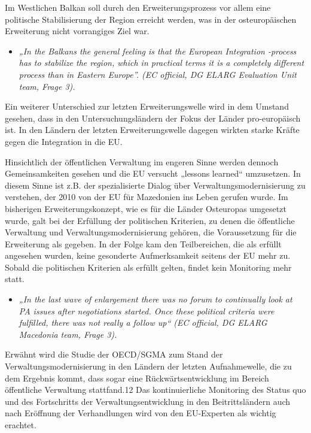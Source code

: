 Im Westlichen Balkan soll durch den Erweiterungsprozess vor allem eine politische Stabilisierung der Region erreicht werden, was in der osteuropäischen Erweiterung nicht vorrangiges Ziel war. 
\begin{itemize}[label={}]
\item \textit{„In the Balkans the general feeling is that the European Integration -process has to stabilize the region, which in practical terms it is a completely different process than in Eastern Europe”. (EC official, DG ELARG Evaluation Unit team, Frage 3). }
\end{itemize}
Ein weiterer Unterschied zur letzten Erweiterungswelle wird in dem Umstand gesehen, dass in den Untersuchungsländern der Fokus der Länder pro-europäisch ist. In den Ländern der letzten Erweiterungswelle dagegen wirkten starke Kräfte gegen die Integration in die EU.\par
Hinsichtlich der öffentlichen Verwaltung im engeren Sinne werden dennoch Gemeinsamkeiten gesehen und die EU versucht „lessons learned“ umzusetzen. In diesem Sinne ist z.B. der spezialisierte Dialog über Verwaltungsmodernisierung zu verstehen, der 2010 von der EU für Mazedonien ins Leben gerufen wurde. Im bisherigen Erweiterungskonzept, wie es für die Länder Osteuropas umgesetzt wurde, galt bei der Erfüllung der politischen Kriterien, zu denen die öffentliche Verwaltung und Verwaltungsmodernisierung gehören, die Voraussetzung für die Erweiterung als gegeben. In der Folge kam den Teilbereichen, die als erfüllt angesehen wurden, keine gesonderte Aufmerksamkeit seitens der EU mehr zu. Sobald die politischen Kriterien als erfüllt gelten, findet kein Monitoring mehr statt.
\begin{itemize}[label={}]
\item \textit{„In the last wave of enlargement there was no forum to continually look at PA issues after negotiations started. Once these political criteria were fulfilled, there was not really a follow up“ (EC official, DG ELARG Macedonia team, Frage 3). }
\end{itemize}
Erwähnt wird die Studie der OECD/SGMA zum Stand der Verwaltungsmodernisierung in den Ländern der letzten Aufnahmewelle, die zu dem Ergebnis kommt, dass sogar eine Rückwärtsentwicklung im Bereich öffentliche Verwaltung stattfand.12 Das kontinuierliche Monitoring des Status quo und des Fortschritts der Verwaltungsentwicklung in den Beitrittsländern auch nach Eröffnung der Verhandlungen wird von den EU-Experten als wichtig erachtet.\par
